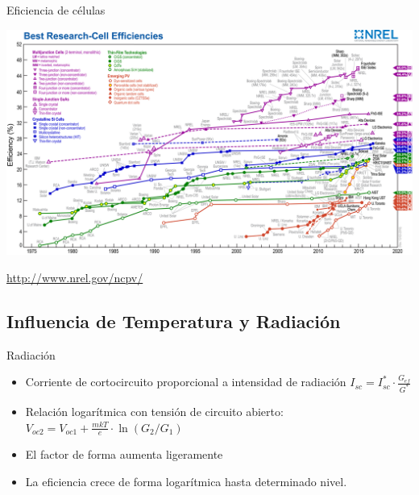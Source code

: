 \documentclass[xcolor={usenames,svgnames,dvipsnames}]{beamer}
\begin{document}
\begin{frame}[plain,label={sec:org35c238c}]{Eficiencia de células}
\begin{center}
\includegraphics[width=1.2\textwidth]{../figs/efficiency_chart_nrel.jpg}
\end{center}

\url{http://www.nrel.gov/ncpv/}
\end{frame}

\subsection{Influencia de Temperatura y Radiación}
\label{sec:orgd53cfde}

\begin{frame}[label={sec:org58f0aec}]{Radiación}
\begin{itemize}
\item \alert{Corriente de cortocircuito proporcional a intensidad de radiación}
\(I_{sc} = I^*_{sc}\cdot\frac{G_{ef}}{G^{*}}\)

\item Relación logarítmica con tensión de circuito abierto:
\(V_{oc2}=V_{oc1}+\frac{mkT}{e}\cdot\ln(G_2/G_1)\)

\item El factor de forma aumenta ligeramente

\item La eficiencia crece de forma logarítmica hasta determinado nivel.
\end{itemize}
\end{frame}
\end{document}
